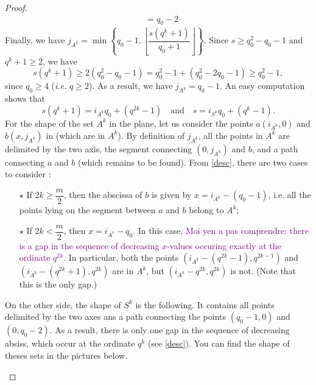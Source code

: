 \documentclass[a4paper]{article}
\newcommand\jade[1]{\textcolor{purple}{#1}}
\begin{document}
\begin{proof}
\begin{align*}
            &= q_0-2
\end{align*}
Finally, we have $j_{A^k} = \min \left\{ q_0-1, \left\lfloor \dfrac{s(q^k+1)}{q_0+1} \right\rfloor \right\}$. Since $s \geq q_0^2 - q_0 -1$ and $q^k+1 \geq 2$, we have
\begin{equation} \label{desc}
s(q^k+1) \geq 2(q_0^2-q_0-1) = q_0^2 - 1 + (q_0^2-2q_0-1) \geq q_0^2-1,
\end{equation}
since $q_0 \geq 4$ (\emph{i.e.} $q \geq 2$). As a result, we have $j_{A^k} = q_0-1$. 
An easy computation shows that 
\[s(q^k+1) = i_{A^k}q_0+(q^{2k}-1) \quad \mathrm{and} \quad s=i_{S^k}q_0 + (q^k-1).\]
For the shape of the set $A^k$ in the plane, let us consider the points $a(i_{A^k},0)$ and $b(x,j_{A^k})$ in  (which are in $A^k$). By definition of $j_{A^k}$, all the points in $A^k$ are delimited by the two axis, the segment connecting $(0,j_{A^k})$ and $b$, and a path connecting $a$ and $b$ (which remains to be found). From \eqref{desc}, there are two cases to consider :  
\begin{enumerate}
    \item[$\star$] If $2k \geq \dfrac{m}{2}$, then the abscissa of $b$ is given by $x=i_{A^k}-(q_0-1)$, i.e. all the points lying on the segment between $a$ and $b$ belong to $A^k$;
    \item[$\star$] If $2k < \dfrac{m}{2}$, then $x=i_{A^k}-q_0$. In this case, \jade{Moi yen a pas comprendre: there is a gap in the sequence of decreasing $x$-values occuring exactly at the ordinate $q^{2k}$.} In particular, both the points $(i_{A^k}-(q^{2k}-1),q^{2k-1})$ and $(i_{A^k}-(q^{2k}+1),q^{2k})$ are in $A^k$, but $(i_{A^k}-q^{2k},q^{2k})$ is not. (Note that this is the only gap.)
\end{enumerate}
On the other side, the shape of $S^k$ is the following. It contains all points delimited by the two axes ans a path connecting the points $(q_0-1,0)$ and $(0,q_0-2)$. As a result, there is only one gap in the sequence of decreasing absiss, which occur at the ordinate $q^k$ (see \eqref{desc}). You can find the shape of theses sets in the pictures below.

\vspace*{0.3cm}
\begin{figure}[h]
\begin{center}
\end{center}
\end{figure}
\end{proof}
\end{document}
